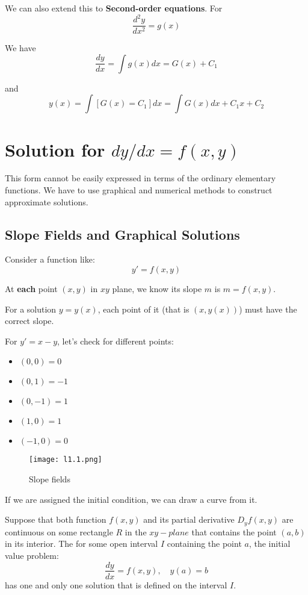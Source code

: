We can also extend this to \textbf{Second-order equations}.
For
\[
    \dfrac{d^2y}{dx^2} = g(x)
\]

We have
\[
    \dfrac{dy}{dx} = \int g(x) dx = G(x) + C_1
\]

and
\[
    y(x) = \int [G(x) = C_1] dx = \int G(x) dx + C_1 x + C_2
\]

\section{Solution for \(dy/dx = f(x, y)\)}

This form cannot be easily expressed in terms of the ordinary elementary functions.
We have to use graphical and numerical methods to construct approximate solutions.

\subsection{Slope Fields and Graphical Solutions}

Consider a function like:
\[
    y' = f(x, y)
\]

At \textbf{each} point \((x, y)\) in \(xy\) plane, we know its slope \(m\) is \(m = f(x, y)\).      

For a solution \(y = y(x)\), each point of it (that is \((x, y(x))\)) must have the correct slope. 

\begin{example}[\(y' = x - y\) ]
    For \(y' = x - y\), let's check for different points:
    \begin{itemize}
        \item \((0, 0) = 0\)  
        \item \((0, 1) = -1\)  
        \item \((0, -1) = 1\)  
        \item \((1, 0) = 1\)  
        \item \((-1, 0) = 0\)  
    \end{itemize}

    \begin{figure}[H]
        \centering 
        \texttt{[image: l1.1.png]}
        \caption{Slope fields}
    \end{figure}

    If we are assigned the initial condition, we can draw a curve from it.
\end{example}

\begin{theorem}
   Suppose that both function \(f(x,y)\) and its partial derivative \(D_y f(x, y)\) are continuous on some rectangle \(R\) in the \(xy-plane\) that contains the point \((a, b)\) in its interior.      
   The for some open interval \(I\) containing the point \(a\), the initial value problem:
   \[
   \dfrac{dy}{dx} = f(x, y), \quad y(a) = b
   \]
   has one and only one solution that is defined on the interval \(I\). 
\end{theorem}

